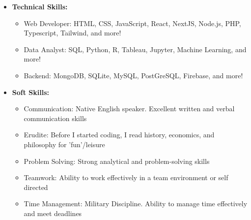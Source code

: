 
\begin{itemize}
  \item \textbf{Technical Skills:}
  \begin{itemize}
    \item Web Developer: HTML, CSS, JavaScript, React, NextJS, Node.js, PHP, Typescript, Tailwind, and more!
    \item Data Analyst: SQL, Python, R, Tableau, Jupyter, Machine Learning, and more!
    \item Backend: MongoDB, SQLite, MySQL, PostGreSQL, Firebase, and more!
  \end{itemize}
  \item \textbf{Soft Skills:}
    \begin{itemize}
      \item Communication: Native English speaker. Excellent written and verbal communication skills
      \item Erudite: Before I started coding, I read history, economics, and philosophy for 'fun'/leisure
      \item Problem Solving: Strong analytical and problem-solving skills
      \item Teamwork: Ability to work effectively in a team environment or self directed
      \item Time Management: Military Discipline. Ability to manage time effectively and meet deadlines
    \end{itemize}
\end{itemize}